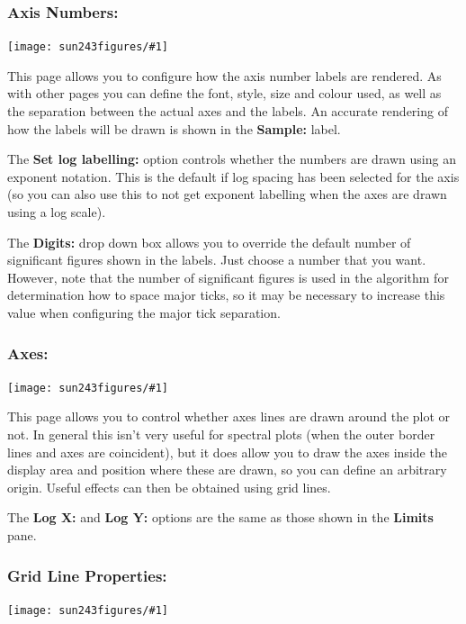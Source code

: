 \documentclass[twoside,11pt]{article}
\newcommand{\htmladdimg}[1]{}
\newcommand{\latexhtml}[2]{#1}
\renewcommand{\_}{\texttt{\symbol{95}}}
\newcommand{\mainfigure}[1]
{\begin{center}
 \latexhtml{\texttt{[image: sun243\_figures/\#1]}}{\htmladdimg{#1.gif}}
 \end{center}
}
\newcommand{\labelitem}[1]{\textbf{#1}}
\begin{document}
\newpage
\subsubsection*{Axis Numbers:}

\mainfigure{configurewindowaxisnumbers}

This page allows you to configure how the axis number labels are rendered. As
with other pages you can define the font, style, size and colour used, as well
as the separation between the actual axes and the labels. An accurate
rendering of how the labels will be drawn is shown in the \labelitem{Sample:}
label.

The \labelitem{Set log labelling:} option controls whether the numbers are
drawn using an exponent notation. This is the default if log spacing has been
selected for the axis (so you can also use this to not get exponent labelling
when the axes are drawn using a log scale).

The \labelitem{Digits:} drop down box allows you to override the
default number of significant figures shown in the labels. Just choose
a number that you want. However, note that the number of significant
figures is used in the algorithm for determination how to space major
ticks, so it may be necessary to increase this value when configuring
the major tick separation.

\newpage
\subsubsection*{Axes:}

\mainfigure{configurewindowaxes}

This page allows you to control whether axes lines are drawn around the plot
or not. In general this isn't very useful for spectral plots (when the outer
border lines and axes are coincident), but it does allow you to draw the axes
inside the display area and position where these are drawn, so you can define
an arbitrary origin. Useful effects can then be obtained using grid lines.

The \labelitem{Log X:} and \labelitem{Log Y:} options are the same as those
shown in the \labelitem{Limits} pane.

\newpage
\subsubsection*{Grid Line Properties:}

\mainfigure{configurewindowgrid}
\end{document}
